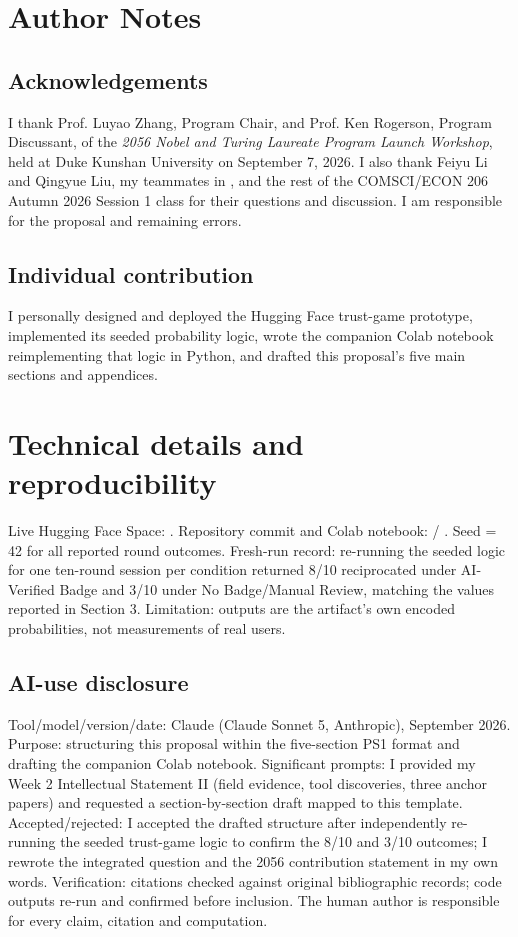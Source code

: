 \clearpage\nobalance
\section*{Author Notes}
\subsection*{Acknowledgements}
I thank Prof. Luyao Zhang, Program Chair, and Prof. Ken Rogerson, Program Discussant, of the \emph{2056 Nobel and Turing Laureate Program Launch Workshop}, held at Duke Kunshan University on September 7, 2026. I also thank Feiyu Li and Qingyue Liu, my teammates in \WorkshopSession{}, and the rest of the COMSCI/ECON 206 Autumn 2026 Session 1 class for their questions and discussion. I am responsible for the proposal and remaining errors.
\subsection*{Individual contribution}
I personally designed and deployed the Hugging Face trust-game prototype, implemented its seeded probability logic, wrote the companion Colab notebook reimplementing that logic in Python, and drafted this proposal's five main sections and appendices.


\appendix
\section{Technical details and reproducibility}
Live Hugging Face Space: \DemoLink. Repository commit and Colab notebook: \GitHubLink{} / \ColabLink. Seed = 42 for all reported round outcomes. Fresh-run record: re-running the seeded logic for one ten-round session per condition returned 8/10 reciprocated under AI-Verified Badge and 3/10 under No Badge/Manual Review, matching the values reported in Section 3. Limitation: outputs are the artifact's own encoded probabilities, not measurements of real users.
\subsection{AI-use disclosure}
Tool/model/version/date: Claude (Claude Sonnet 5, Anthropic), September 2026. Purpose: structuring this proposal within the five-section PS1 format and drafting the companion Colab notebook. Significant prompts: I provided my Week 2 Intellectual Statement II (field evidence, tool discoveries, three anchor papers) and requested a section-by-section draft mapped to this template. Accepted/rejected: I accepted the drafted structure after independently re-running the seeded trust-game logic to confirm the 8/10 and 3/10 outcomes; I rewrote the integrated question and the 2056 contribution statement in my own words. Verification: citations checked against original bibliographic records; code outputs re-run and confirmed before inclusion. The human author is responsible for every claim, citation and computation.

